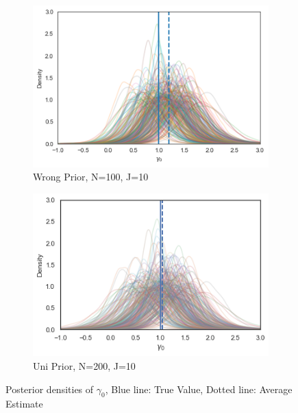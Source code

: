\begin{figure}[h!]
  \centering
  \begin{subfigure}[b]{0.4\linewidth}
    \includegraphics[width=\linewidth]{graphics/posterior_plot_gamma0_wrong}
    \caption{Wrong Prior, N=100, J=10}
  \end{subfigure}
  \begin{subfigure}[b]{0.4\linewidth}
    \includegraphics[width=\linewidth]{graphics/posterior_plot_gamma0_uni}
    \caption{Uni Prior, N=200, J=10}
  \end{subfigure}
  \caption{Posterior densities of $\gamma_0$, Blue line: True Value, Dotted line: Average Estimate}
  \label{fig:gamma0_posterior}
\end{figure}

